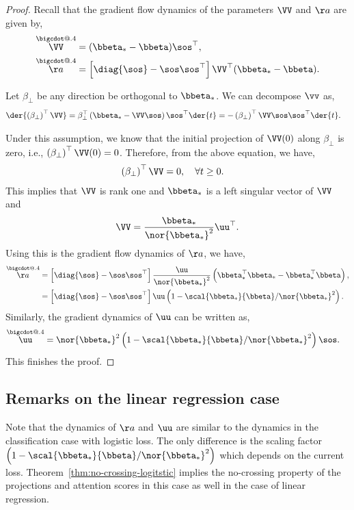 \documentclass{article}
\makeatletter
\newcommand*\bigcdot{\mathpalette\bigcdot@{.4}}
\newcommand*\bigcdot@[2]{\mathbin{\vcenter{\hbox{\scalebox{#2}{$\m@th#1\bullet$}}}}}
\newcommand{\mdot}[1]{\overset{\bigcdot}{#1}}
\theoremstyle{plain}
\theoremstyle{definition}
\theoremstyle{remark}
\makeatother
\begin{document}
\Regression*
\begin{proof}
    Recall that the gradient flow dynamics of the parameters $\VV$ and $\aa$ are given by,
    \begin{align}
    \mdot{\VV} &= ( \bbeta_* - \bbeta ) \sos^{\top}, \\
    \mdot{\aa} &= \left[ \diag{\sos} - \sos \sos^{\top} \right] \VV^{\top} ( \bbeta_* - \bbeta ).
\end{align}

Let $\beta_{\perp}$ be any direction be orthogonal to $\bbeta_*$. We can decompose $\vv$ as,
\begin{align*}
   \der{ \left( \beta_{\perp} \right)^{\top} \VV }  &= \beta_{\perp}^{\top} \left( \bbeta_* - \VV \sos \right) \sos^{\top} \der{t} = -  \left( \beta_{\perp} \right)^{\top} \VV \sos \sos^{\top} \der{t}.
\end{align*}

Under this assumption, we know that the initial projection of $\VV(0)$ along $\beta_{\perp}$ is zero, i.e., $\left( \beta_{\perp} \right)^{\top} \VV(0) = 0$. Therefore, from the above equation, we have,
\begin{align*}
    \left( \beta_{\perp} \right)^{\top} \VV &= 0, \quad \forall t \geq 0.
\end{align*}
This implies that $\VV$ is rank one and $\bbeta_*$ is a left singular vector of $\VV$ and $$ \VV = \frac{\bbeta_*}{\nor{\bbeta_*}^2} \uu^{\top}. $$
Using this is the gradient flow dynamics of $\aa$, we have,
\begin{align*}
    \mdot{\aa} &= \left[ \diag{\sos} - \sos \sos^{\top} \right] \frac{\uu}{\nor{\bbeta_*}^2} \left( \bbeta_*^{\top} \bbeta_* - \bbeta_*^{\top} \bbeta \right), \\
    &= \left[ \diag{\sos} - \sos \sos^{\top} \right] \uu \left( 1 - \scal{\bbeta_*}{\bbeta} / \nor{\bbeta_*}^2 \right).     
\end{align*}
Similarly, the gradient dynamics of $\uu$ can be written as,
\begin{align*}
    \mdot{\uu} &= \nor{\bbeta_*}^2 \left( 1 - \scal{\bbeta_*}{\bbeta} / \nor{\bbeta_*}^2 \right) \sos.
\end{align*}
This finishes the proof. 
\end{proof}


\subsection{Remarks on the linear regression case}
Note that the dynamics of $\aa$ and $\uu$ are similar to the dynamics in the classification case with logistic loss. The only difference is the scaling factor $\left( 1 - \scal{\bbeta_*}{\bbeta} / \nor{\bbeta_*}^2 \right)$ which depends on the current loss. Theorem~\ref{thm:no-crossing-logitstic} implies the no-crossing property of the projections and attention scores in this case as well in the case of linear regression.
\end{document}
